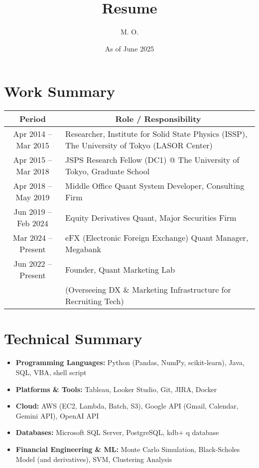 \documentclass[uplatex,a4j,10.5pt,dvipdfmx]{jsarticle}
\title{\sffamily \bfseries Resume}
\author{M. O.}
\date{As of June 2025}
\begin{document}
\maketitle

\section*{Work Summary}

\begin{longtable}{|c|p{14cm}|}
	\hline
	\multicolumn{1}{|c|}{\textbf{Period}} & \multicolumn{1}{c|}{\textbf{Role / Responsibility}}                                          \\
	\hline
	\endhead

	\hline
	Apr 2014 -- Mar 2015                  & Researcher, Institute for Solid State Physics (ISSP), The University of Tokyo (LASOR Center) \\
	\hline
	Apr 2015 -- Mar 2018                  & JSPS Research Fellow (DC1) @ The University of Tokyo, Graduate School                        \\
	\hline
	Apr 2018 -- May 2019                  & Middle Office Quant System Developer, Consulting Firm                                        \\
	\hline
	Jun 2019 -- Feb 2024                  & Equity Derivatives Quant, Major Securities Firm                                              \\
	\hline
	Mar 2024 -- Present                   & eFX (Electronic Foreign Exchange) Quant Manager, Megabank                                    \\
	\hline
	Jun 2022 -- Present                   & Founder, Quant Marketing Lab                                                                 \\
	                                      & (Overseeing DX \& Marketing Infrastructure for Recruiting Tech)                              \\
	\hline
\end{longtable}

\section*{Technical Summary}
\begin{itemize}
	\item \textbf{Programming Languages:} Python (Pandas, NumPy, scikit-learn), Java, SQL, VBA, shell script
	\item \textbf{Platforms \& Tools:} Tableau, Looker Studio, Git, JIRA, Docker
	\item \textbf{Cloud:} AWS (EC2, Lambda, Batch, S3), Google API (Gmail, Calendar, Gemini API), OpenAI API
	\item \textbf{Databases:} Microsoft SQL Server, PostgreSQL, kdb+ q database
	\item \textbf{Financial Engineering \& ML:} Monte Carlo Simulation, Black-Scholes Model (and derivatives), SVM, Clustering Analysis
\end{itemize}
\end{document}
